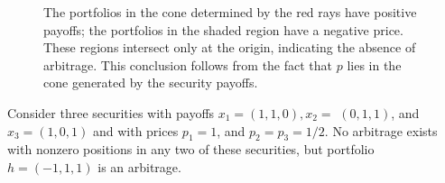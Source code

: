 \documentclass[\topdir/lecture\_notes.tex]{subfiles}
\begin{document}
\begin{figure}
\begin{center}
    \end{center}
    \caption{The portfolios in the cone determined by the red rays have positive payoffs; the portfolios in the shaded region have a negative price. These regions intersect only at the origin, indicating the absence of arbitrage. This conclusion follows from the fact that \(p\) lies in the cone generated by the security payoffs.}
    \label{fig:no_arbitrage_case}
\end{figure}

\begin{example}\label{ex:three_securities_arbitrage}
Consider three securities with payoffs \(x_{1}=(1,1,0), x_{2}=\) $(0,1,1)$, and \(x_{3}=(1,0,1)\) and with prices \(p_{1}=1\), and \(p_{2}=p_{3}=1 / 2\). No arbitrage exists with nonzero positions in any two of these securities, but portfolio \(h=(-1,1,1)\) is an arbitrage.
\end{example}
\end{document}
